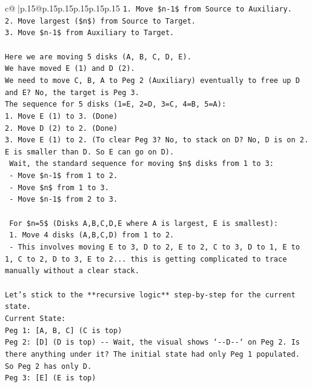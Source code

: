 \documentclass{article}
\begin{document}
{\begin{supertabular}{c@{$\;$}|p{.15\linewidth}@{}p{.15\linewidth}p{.15\linewidth}p{.15\linewidth}p{.15\linewidth}p{.15\linewidth}}
{{{\texttt{1. Move \$n{-}1\$ from Source to Auxiliary.} \\
\texttt{2. Move largest (\$n\$) from Source to Target.} \\
\texttt{3. Move \$n{-}1\$ from Auxiliary to Target.} \\
\\ 
\texttt{Here we are moving 5 disks (A, B, C, D, E).} \\
\texttt{We have moved E (1) and D (2).} \\
\texttt{We need to move C, B, A to Peg 2 (Auxiliary) eventually to free up D and E? No, the target is Peg 3.} \\
\texttt{The sequence for 5 disks (1=E, 2=D, 3=C, 4=B, 5=A):} \\
\texttt{1. Move E (1) to 3. (Done)} \\
\texttt{2. Move D (2) to 2. (Done)} \\
\texttt{3. Move E (1) to 2. (To clear Peg 3? No, to stack on D? No, D is on 2. E is smaller than D. So E can go on D).} \\
\texttt{   Wait, the standard sequence for moving \$n\$ disks from 1 to 3:} \\
\texttt{   {-} Move \$n{-}1\$ from 1 to 2.} \\
\texttt{   {-} Move \$n\$ from 1 to 3.} \\
\texttt{   {-} Move \$n{-}1\$ from 2 to 3.} \\
\\ 
\texttt{   For \$n=5\$ (Disks A,B,C,D,E where A is largest, E is smallest):} \\
\texttt{   1. Move 4 disks (A,B,C,D) from 1 to 2.} \\
\texttt{      {-} This involves moving E to 3, D to 2, E to 2, C to 3, D to 1, E to 1, C to 2, D to 3, E to 2... this is getting complicated to trace manually without a clear stack.} \\
\\ 
\texttt{Let's stick to the **recursive logic** step{-}by{-}step for the current state.} \\
\texttt{Current State:} \\
\texttt{Peg 1: {[}A, B, C{]} (C is top)} \\
\texttt{Peg 2: {[}D{]} (D is top) {-}{-} Wait, the visual shows `{-}{-}D{-}{-}` on Peg 2. Is there anything under it? The initial state had only Peg 1 populated. So Peg 2 has only D.} \\
\texttt{Peg 3: {[}E{]} (E is top)} \\
\\ 
}}}
\end{supertabular}}
\end{document}
